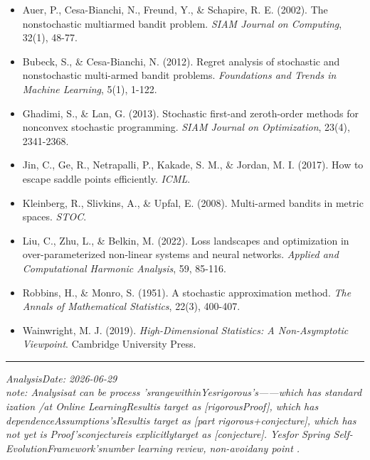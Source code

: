 \documentclass[
  12pt,
]{article}
\providecommand{\tightlist}{%
  \setlength{\itemsep}{0pt}\setlength{\parskip}{0pt}}
\begin{document}
\begin{itemize}
\tightlist
\item
  Auer, P., Cesa-Bianchi, N., Freund, Y., \& Schapire, R. E. (2002). The
  nonstochastic multiarmed bandit problem. \emph{SIAM Journal on
  Computing}, 32(1), 48-77.
\item
  Bubeck, S., \& Cesa-Bianchi, N. (2012). Regret analysis of stochastic
  and nonstochastic multi-armed bandit problems. \emph{Foundations and
  Trends in Machine Learning}, 5(1), 1-122.
\item
  Ghadimi, S., \& Lan, G. (2013). Stochastic first-and zeroth-order
  methods for nonconvex stochastic programming. \emph{SIAM Journal on
  Optimization}, 23(4), 2341-2368.
\item
  Jin, C., Ge, R., Netrapalli, P., Kakade, S. M., \& Jordan, M. I.
  (2017). How to escape saddle points efficiently. \emph{ICML}.
\item
  Kleinberg, R., Slivkins, A., \& Upfal, E. (2008). Multi-armed bandits
  in metric spaces. \emph{STOC}.
\item
  Liu, C., Zhu, L., \& Belkin, M. (2022). Loss landscapes and
  optimization in over-parameterized non-linear systems and neural
  networks. \emph{Applied and Computational Harmonic Analysis}, 59,
  85-116.
\item
  Robbins, H., \& Monro, S. (1951). A stochastic approximation method.
  \emph{The Annals of Mathematical Statistics}, 22(3), 400-407.
\item
  Wainwright, M. J. (2019). \emph{High-Dimensional Statistics: A
  Non-Asymptotic Viewpoint}. Cambridge University Press.
\end{itemize}

\begin{center}\rule{0.5\linewidth}{0.5pt}\end{center}

\emph{AnalysisDate: 2026-06-29}\\
\emph{note: Analysisat can be process 'srangewithinYesrigorous's------which has standard ization /at Online LearningResultis target as 
{[}rigorousProof{]}, which has dependenceAssumptions'sResultis target as 
{[}part rigorous+conjecture{]}, which has not yet is Proof'sconjectureis explicitlytarget as  {[}conjecture{]}. Yesfor 
Spring Self-EvolutionFramework'snumber learning review, non-avoidany point . }
\end{document}
